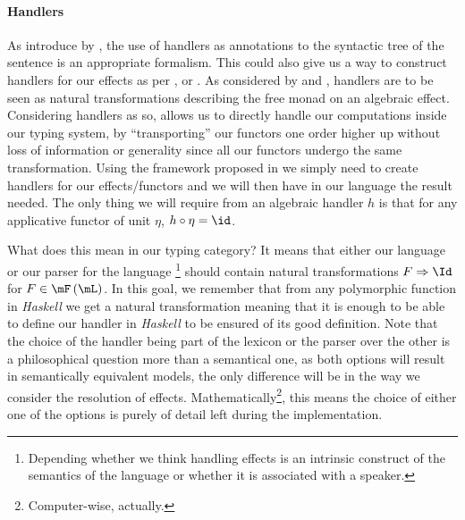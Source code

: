 \paragraph{Handlers}
\label{par:handlers}
As introduce by , the use of handlers
as annotations to the syntactic tree of the sentence is an appropriate
formalism.
This could also give us a way to construct handlers for our effects as per
, or
.
As considered by  and
, handlers are to be seen
as natural transformations describing the free monad on an algebraic effect.
Considering handlers as so, allows us to directly handle our computations
inside our typing system, by ``transporting'' our functors one order higher up
without loss of information or generality since all our functors undergo the
same transformation.
Using the framework proposed in \cite{vandenbergFrameworkHigherorderEffects2024}
we simply need to create handlers for our effects/functors and we will then
have in our language the result needed.
The only thing we will require from an algebraic handler $h$ is that for any
applicative functor of unit $\eta$, $h\circ \eta = \id$.

\medskip

What does this mean in our typing category?
It means that either our language or our parser for the language
\footnote{Depending whether we think handling effects is an intrinsic construct
	of the semantics of the language or whether it is associated with a speaker.}
should contain natural transformations $F \Rightarrow \Id$ for
$F \in \mF\left( \mL \right)$.
In this goal, we remember that from any polymorphic function in \emph{Haskell}
we get a natural transformation \cite{wadlerTheoremsFree1989} meaning that it
is enough to be able to define our handler in \emph{Haskell} to be ensured of
its good definition.
Note that the choice of the handler being part of the lexicon or the parser
over the other is a philosophical question more than a semantical one, as both
options will result in semantically equivalent models, the only difference will
be in the way we consider the resolution of effects.
Mathematically\footnote{Computer-wise, actually.}, this means the choice of
either one of the options is purely of detail left during the implementation.


